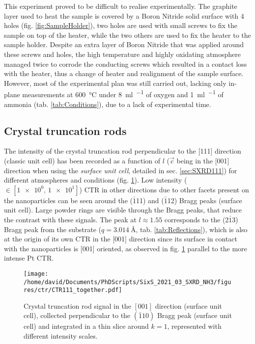 This experiment proved to be difficult to realise experimentally.
The graphite layer used to heat the sample is covered by a Boron Nitride solid surface with 4 holes (fig. \ref{fig:SampleHolder}), two holes are used with small screws to fix the sample on top of the heater, while the two others are used to fix the heater to the sample holder.
Despite an extra layer of Boron Nitride that was applied around these screws and holes, the high temperature and highly oxidating atmosphere managed twice to corrode the conducting screws which resulted in a contact loss with the heater, thus a change of heater and realignment of the sample surface.
However, most of the experimental plan was still carried out, lacking only in-plane measurements at \qty{600}{\degreeCelsius} under \qty{8}{\ml\per\min} of oxygen and \qty{1}{\ml\per\min} of ammonia (tab. \ref{tab:Conditions}), due to a lack of experimental time.

\subsection{Crystal truncation rods}

The intensity of the crystal truncation rod perpendicular to the [111] direction (classic unit cell) has been recorded as a function of $l$ ($\vec{c}$ being in the [001] direction when using the \textit{surface unit cell}, detailed in sec. \ref{sec:SXRD111}) for different atmospheres and conditions (fig. \ref{fig:2DCTR111Particles}).
Low intensity ($\in [\num{1e0},\, \num{1e1}]$) CTR in other directions due to other facets present on the nanoparticles can be seen around the ($\bar{1}$11) and ($\bar{1}$12) Bragg peaks (surface unit cell).
Large powder rings are visible through the Bragg peaks, that reduce the contrast with these signals.
The peak at $l\approx1.55$ corresponds to the (2$\bar{1}$3) Bragg peak from the  substrate ($q = \qty{3.014}{\angstrom}$, tab. \ref{tab:Reflections}), which is also at the origin of its own CTR in the [001] direction since its surface in contact with the nanoparticles is [001] oriented, as observed in fig. \ref{fig:2DCTR111Particles} parallel to the more intense Pt CTR.

\begin{figure}[!htb]
    \centering
    \texttt{[image: /home/david/Documents/PhDScripts/SixS\_2021\_03\_SXRD\_NH3/figures/ctr/CTR111\_together.pdf]}
    \caption{
        Crystal truncation rod signal in the $[001]$ direction (surface unit cell), collected perpendicular to the $(\bar{1}10)$ Bragg peak (surface unit cell) and integrated in a thin slice around $k=1$, represented with different intensity scales.
    }
    \label{fig:2DCTR111Particles}
\end{figure}

